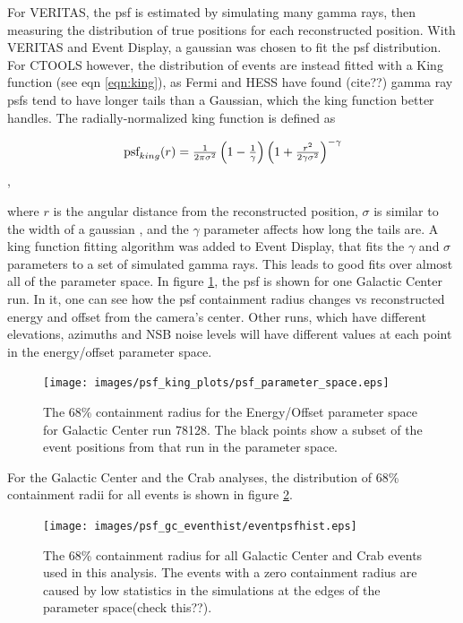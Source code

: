     For VERITAS, the psf is estimated by simulating many gamma rays, then measuring the distribution of true positions for each reconstructed position.
    With VERITAS and Event Display, a gaussian was chosen to fit the psf distribution.
    For CTOOLS however, the distribution of events are instead fitted with a King function (see eqn \ref{eqn:king}), as Fermi and HESS have found (cite??) gamma ray psfs tend to have longer tails than a Gaussian, which the king function better handles.
    The radially-normalized king function is defined as

    \begin{equation} \label{eqn:king}
    $$ \text{psf}_{king}(r) = \frac{1}{2 \pi \sigma^{2} } \left( 1 - \frac{1}{\gamma} \right) \left( 1 + \frac{ r^{2} }{ 2 \gamma \sigma^{2} } \right)^{-\gamma} $$
    \end{equation},

    where $r$ is the angular distance from the reconstructed position, $\sigma$ is similar to the width of a gaussian , and the $\gamma$ parameter affects how long the tails are.
    A king function fitting algorithm was added to Event Display, that fits the $\gamma$ and $\sigma$ parameters to a set of simulated gamma rays.
    This leads to good fits over almost all of the parameter space.
    In figure \ref{fig:psf_paramspace}, the psf is shown for one Galactic Center run.
    In it, one can see how the psf containment radius changes vs reconstructed energy and offset from the camera's center.
    Other runs, which have different elevations, azimuths and NSB noise levels will have different values at each point in the energy/offset parameter space.

    \begin{figure}[ht]
      \begin{center}
        \texttt{[image: images/psf\_king\_plots/psf\_parameter\_space.eps]}
        \caption[PSF Parameter Space]{The 68\% containment radius for the Energy/Offset parameter space for Galactic Center run 78128. The black points show a subset of the event positions from that run in the parameter space.}\label{fig:psf_paramspace}
      \end{center}
    \end{figure}

    For the Galactic Center and the Crab analyses, the distribution of 68\% containment radii for all events is shown in figure \ref{fig:gc_psf_hist}.

    \begin{figure}[ht]
      \begin{center}
        \texttt{[image: images/psf\_gc\_eventhist/eventpsfhist.eps]}
        \caption[Crab and Galactic Center Event PSFs]{The 68\% containment radius for all Galactic Center and Crab events used in this analysis.  The events with a zero containment radius are caused by low statistics in the simulations at the edges of the parameter space(check this??).}\label{fig:gc_psf_hist}
      \end{center}
    \end{figure}

